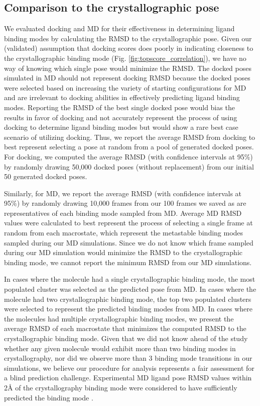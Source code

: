 \subsection{Comparison to the crystallographic pose}
We evaluated docking and MD for their effectiveness in determining ligand binding modes by calculating the RMSD to the crystallographic pose.
Given our (validated) assumption that docking scores does poorly in indicating closeness to the crystallographic binding mode (Fig. \ref{fig:topscore_correlation}), we have no way of knowing which single pose would minimize the RMSD.
The docked poses simulated in MD should not represent docking RMSD because the docked poses were selected based on increasing the variety of starting configurations for MD and are irrelevant to docking abilities in effectively predicting ligand binding modes.
Reporting the RMSD of the best single docked pose would bias the results in favor of docking and not accurately represent the process of using docking to determine ligand binding modes but would show a rare best case scenario of utilizing docking.
Thus, we report the average RMSD from docking to best represent selecting a pose at random from a pool of generated docked poses.
For docking, we computed the average RMSD (with confidence intervals at 95\%) by randomly drawing 50,000 docked poses (without replacement) from our initial 50 generated docked poses.

Similarly, for MD, we report the average RMSD (with confidence intervals at 95\%) by randomly drawing 10,000 frames from our 100 frames we saved as are representatives of each binding mode sampled from MD.
Average MD RMSD values were calculated to best represent the process of selecting a single frame at random from each macrostate, which represent the metastable binding modes sampled during our MD simulations.
Since we do not know which frame sampled during our MD simulation would minimize the RMSD to the crystallographic binding mode, we cannot report the minimum RMSD from our MD simulations.

In cases where the molecule had a single crystallographic binding mode, the most populated cluster was selected as the predicted pose from MD.
In cases where the molecule had two crystallographic binding mode, the top two populated clusters were selected to represent the predicted binding modes from MD.
In cases where the molecules had multiple crystallographic binding modes, we present the average RMSD of each macrostate that minimizes the computed RMSD to the crystallographic binding mode.
Given that we did not know ahead of the study whether any given molecule would exhibit more than two binding modes in crystallography, nor did we observe more than 3 binding mode transitions in our simulations, we believe our procedure for analysis represents a fair assessment for a blind prediction challenge.
Experimental MD ligand pose RMSD values within 2{\AA} of the crystallography binding mode were considered to have sufficiently predicted the binding mode \cite{warren_critical_2006} \cite{plewczynski_can_2011}. 

